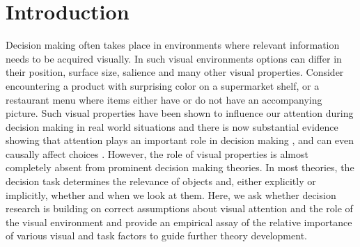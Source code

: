 \documentclass{article}
\begin{document}
\section{Introduction}


Decision making often takes place in environments where relevant information needs to be acquired visually. In such visual environments options can differ in their position, surface size, salience and many other visual properties. Consider encountering a product with surprising color on a  supermarket shelf, or a restaurant menu where items either have or do not have an accompanying picture. Such visual properties have been shown to influence our attention during decision making in real world situations and there is now substantial evidence showing that attention plays an important role in decision making \citep{gidloef2017a}, and can even causally affect choices \citep{ghaffari2018a, paernamets2015a, shimojo2003a}. However, the role of visual properties is almost completely absent from prominent decision making theories. In most theories, the decision task determines the relevance of objects and, either explicitly or implicitly, whether and when we look at them. Here, we ask whether decision research is building on correct assumptions about visual attention and the role of the visual environment and provide an empirical assay of the relative importance of various visual and task factors to guide further theory development.


\end{document}
